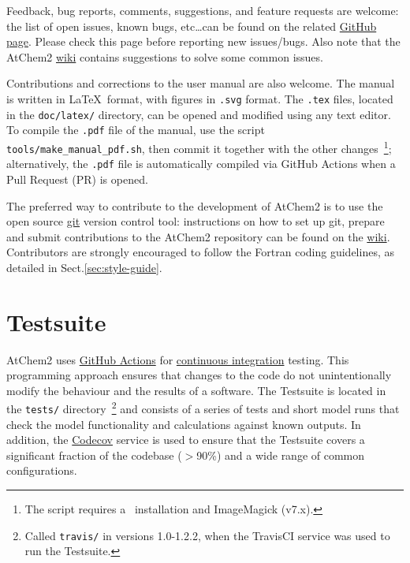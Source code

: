 Feedback, bug reports, comments, suggestions, and feature requests are
welcome: the list of open issues, known bugs, etc\ldots can be found on
the related \href{https://github.com/AtChem/AtChem2/issues}{GitHub page}.
Please check this page before reporting new issues/bugs. Also note
that the AtChem2 \href{https://github.com/AtChem/AtChem2/wiki}{wiki}
contains suggestions to solve some common issues.

Contributions and corrections to the user manual are also welcome. The
manual is written in \LaTeX\ format, with figures in \texttt{.svg}
format. The \texttt{.tex} files, located in the \texttt{doc/latex/}
directory, can be opened and modified using any text editor. To
compile the \texttt{.pdf} file of the manual, use the script
\texttt{tools/make\_manual\_pdf.sh}, then commit it together with the
other changes~\footnote{The script requires a \LateX\ installation and
  ImageMagick (v7.x).}; alternatively, the \texttt{.pdf} file is
automatically compiled via GitHub Actions when a Pull Request (PR) is
opened.

The preferred way to contribute to the development of AtChem2 is to
use the open source \href{https://git-scm.com}{git} version control
tool: instructions on how to set up git, prepare and submit
contributions to the AtChem2 repository can be found on the
\href{https://github.com/AtChem/AtChem2/wiki/How-to-contribute}{wiki}.
Contributors are strongly encouraged to follow the Fortran coding
guidelines, as detailed in Sect.\ref{sec:style-guide}.

\section{Testsuite} \label{sec:test-suite}

AtChem2 uses \href{https://github.com/features/actions}{GitHub Actions}
for \underline{continuous integration} testing. This programming
approach ensures that changes to the code do not unintentionally
modify the behaviour and the results of a software. The Testsuite is
located in the \texttt{tests/} directory~\footnote{Called
  \texttt{travis/} in versions 1.0-1.2.2, when the TravisCI service
  was used to run the Testsuite.}  and consists of a series of tests
and short model runs that check the model functionality and
calculations against known outputs. In addition, the
\href{https://codecov.io}{Codecov} service is used to ensure that the
Testsuite covers a significant fraction of the codebase ($>$90\%) and
a wide range of common configurations.

